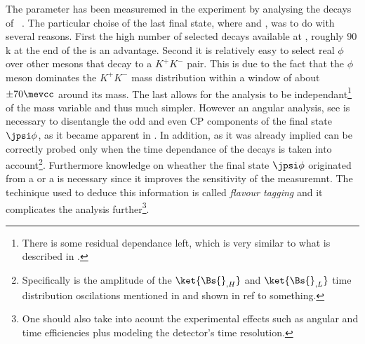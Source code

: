 The parameter \phis has been measuremed in the \lhcb experiment by analysing the decays of \BsJpsiPhi~\cite{phis-3fb-paper}.
The particular choise of the last final state, where \phiKK and \Jpsimumu, was to do with several reasons. First the high number
of selected \BsJpsiPhi decays available at \lhcb, roughly $90$k at the end of the \runtwo is an advantage. Second it is relatively easy
to select real $\phi$ over other mesons that decay to a $K^+K^-$ pair. This is due to the fact that the $\phi$ meson dominates the
$K^+K^-$ mass distribution within a window of about $\pm 70 \mevcc$ around its mass. The last allows for the analysis to be
independant\footnote{There is some residual dependance left, which is very similar to what is described in . }
of the \mkk mass variable and thus much simpler. However an angular analysis, see  is necessary
to disentangle the odd and even CP components of the final state $\jpsi\phi$, as it became apparent in .
In addition, as it was already implied \phis can be correctly probed only when the time dependance of the \BsJpsiPhi decays is taken into
account\footnote{Specifically \phis is the amplitude of the $\ket{\Bs{}_{,H}}$ and $\ket{\Bs{}_{,L}}$ time distribution oscilations
mentioned in and shown in {\color{red} ref to something.} }.
Furthermore knowledge on wheather the final state $\jpsi\phi$ originated from a \Bs or a \Bsb is necessary since it
improves the sensitivity of the \phis measuremnt. The techinique used to deduce this information is called {\it flavour tagging}
and it complicates the analysis further\footnote{One should also take into acount the experimental effects such as angular and time efficiencies plus modeling the \lhcb detector's time resolution.}.

